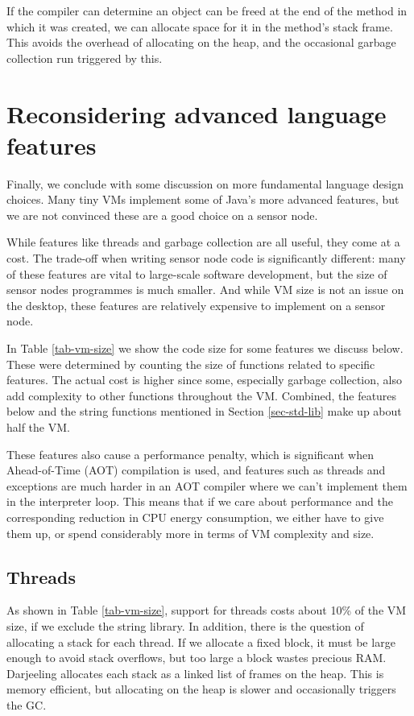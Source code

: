 If the compiler can determine an object can be freed at the end of the method in which it was created, we can allocate space for it in the method's stack frame. This avoids the overhead of allocating on the heap, and the occasional garbage collection run triggered by this.



\section{Reconsidering advanced language features}
\label{sec-advanced-features}
Finally, we conclude with some discussion on more fundamental language design choices. Many tiny VMs implement some of Java's more advanced features, but we are not convinced these are a good choice on a sensor node.

While features like threads and garbage collection are all useful, they come at a cost. The trade-off when writing sensor node code is significantly different: many of these features are vital to large-scale software development, but the size of sensor nodes programmes is much smaller. And while VM size is not an issue on the desktop, these features are relatively expensive to implement on a sensor node.

In Table \ref{tab-vm-size} we show the code size for some features we discuss below. These were determined by counting the size of functions related to specific features. The actual cost is higher since some, especially garbage collection, also add complexity to other functions throughout the VM. Combined, the features below and the string functions mentioned in Section \ref{sec-std-lib} make up about half the VM.

These features also cause a performance penalty, which is significant when Ahead-of-Time (AOT) compilation is used, and features such as threads and exceptions are much harder in an AOT compiler where we can't implement them in the interpreter loop. This means that if we care about performance and the corresponding reduction in CPU energy consumption, we either have to give them up, or spend considerably more in terms of VM complexity and size.

\subsection{Threads}
As shown in Table \ref{tab-vm-size}, support for threads costs about 10\% of the VM size, if we exclude the string library. In addition, there is the question of allocating a stack for each thread. If we allocate a fixed block, it must be large enough to avoid stack overflows, but too large a block wastes precious RAM. Darjeeling allocates each stack as a linked list of frames on the heap. This is memory efficient, but allocating on the heap is slower and occasionally triggers the GC.


